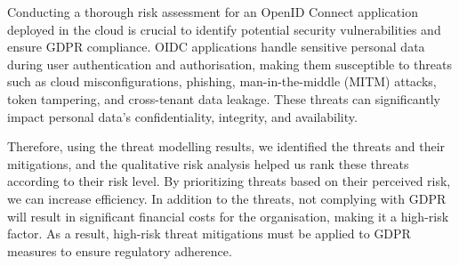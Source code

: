 Conducting a thorough risk assessment for an OpenID Connect application deployed in the cloud is crucial to identify potential security vulnerabilities and ensure GDPR compliance. OIDC applications handle sensitive personal data during user authentication and authorisation, making them susceptible to threats such as cloud misconfigurations, phishing, man-in-the-middle (MITM) attacks, token tampering, and cross-tenant data leakage. These threats can significantly impact personal data's confidentiality, integrity, and availability. 

Therefore, using the threat modelling results, we identified the threats and their mitigations, and the qualitative risk analysis helped us rank these threats according to their risk level. By prioritizing threats based on their perceived risk, we can increase efficiency. In addition to the threats, not complying with GDPR will result in significant financial costs for the organisation, making it a high-risk factor. As a result, high-risk threat mitigations must be applied to GDPR measures to ensure regulatory adherence. 








